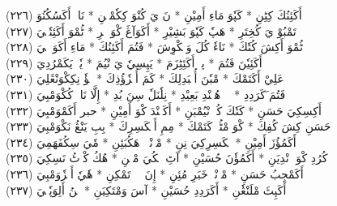 \documentclass[a4paper, 10pt]{report}
\begin{document}
\begin{center}
\textarabic{(٢٢٦) \textcolor{mygreen}{أَكَئِنُكَ كِٹِنِ  * كَپٗوَ مَاءِ أَمِيْنِ  * نَ يَ كُنْوَ كِكٗمْبٖنِ  * نَاءٖ أَكَسُكُتُوَ }} 
\\[5mm] 

\textarabic{(٢٢٧) \textcolor{mygreen}{تَمْبُوْ يَ كُخِتَرِ  * هَپٗ كَپٗوَ بَشِيْرِ  * أَكَوَآڠَ كْوَ هٖرِ  * ٹُمْوَ أَكَئِتٗكٖيَ }} 
\\[5mm] 

\textarabic{(٢٢٨) \textcolor{mygreen}{ٹُمْوَ أَكِشَ كُتٗكَ  * نَاءٗ كُلَ وَمٖكْوِشَ  * فَتُمَ أَكَئِنُكَ  * مَاءِ أَكَوَپٖكٖيَ }} 
\\[5mm] 

\textarabic{(٢٢٩) \textcolor{mygreen}{أَكَئِيٗنَ فَتُمَ  * پٹٖ أَكَئِٹِزَمَ  * يَپِسِيٗ يَ نْيُمَ  * يٗتٖ يَكَمْرُدِيَ }} 
\\[5mm] 

\textarabic{(٢٣٠) \textcolor{mygreen}{عَلِيْ أَكَتَمْكَ  * مْبٗنَ أُمٖبَدِلِكَ  * كَمَ أُمٖزٗؤُذِكَ  * يٖؤٗ نِكِكْوَنْڠَلِيَ }} 
\\[5mm] 

\textarabic{(٢٣١) \textcolor{mygreen}{فَتُمَ َكَرَدِدِ  * وٖوٖ هُنٖنْدِ بَعِيْدِ  * نِلٗنَلٗ سِنَ بُدِ  * إِلَّا نَاوٖ كُكْوَمْبِيَ }} 
\\[5mm] 

\textarabic{(٢٣٢) \textcolor{mygreen}{أَكِسِكِيَ حَسَنِ  * كَتٗكَ كُلٖ نْيُمْبَنِ  * أَكَنٖنْدَ كْوَ أَمِيْنِ  * حبر أَكَمْوَمْبِيَ }} 
\\[5mm] 

\textarabic{(٢٣٣) \textcolor{mygreen}{حَسَنِ كِشَ كُفِكَ  * كْوَ مْٹُمٖ كَتَمْكَ  * مِمِ أَمٖكَسِرِكَ  * بِبِ يَنْڠُ نَكْوَمْبِيَ }} 
\\[5mm] 

\textarabic{(٢٣٤) \textcolor{mygreen}{أَكَمُؤُزَ أَمِيْنِ  * مٖكَسِرِكِيَ نِنِ  * مْوٖنْيٖوٖ هَكُبَئِنِ  * مٗيَ سِكُفَهَمِيَ }} 
\\[5mm] 

\textarabic{(٢٣٥) \textcolor{mygreen}{كُرُدِ كْوَكٖ نْدِيَنِ  * أَكَمُؤٗنَ حُسَيْنِ  * آٹِ مٖكُيَ مْڠٖنِ  * هُكُ كْوٖٹُ نَسِكِيَ }} 
\\[5mm] 

\textarabic{(٢٣٦) \textcolor{mygreen}{أَكَمْجِبُ حَسَنِ  * مْوٖنْيٖ خَبَرِ مُئِنِ  * إِنَ يٖيٖ تَمْكِنِ  * هٗيٗ أَمٖزٗوَمْبِيَ }} 
\\[5mm] 

\textarabic{(٢٣٧) \textcolor{mygreen}{أَكَپِٹَ مْلَنْڠٗنِ  * أَكَرَدِدِ حُسَيْنِ  * آسَ وَمْتَكِيَنِ  * پٖنُ أَلِوَپٗتٖيَ }} 
\\[5mm] 


\end{center}
\end{document}
